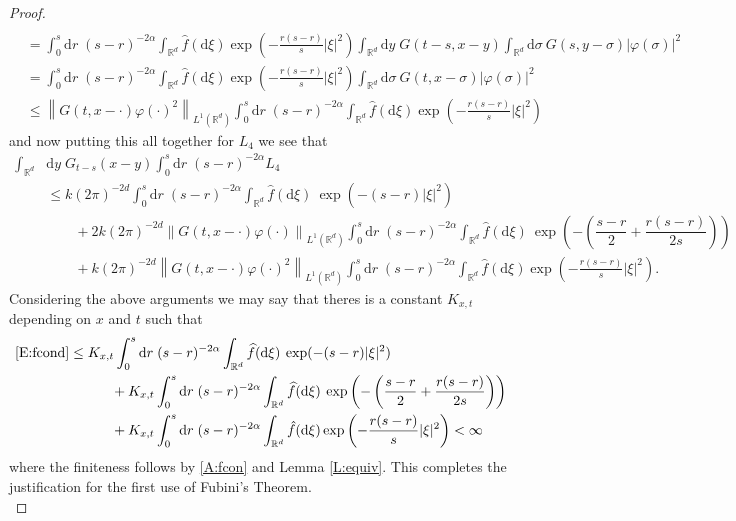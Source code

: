 \documentclass[a4paper,11pt]{article}%
\numberwithin{equation}{section}
\theoremstyle{plain}
\theoremstyle{definition}
\newcommand{\R}{\mathbb{R}}
\newcommand{\Norm}[1]{\left\|  #1   \right\|}
\newcommand{\ud}{\ensuremath{ \mathrm{d} }}
\begin{document}
\begin{proof}
\begin{align*}
	\\&= \int_0^s\ud r\; (s-r)^{-2\alpha}\int_{\R^d} \hat{f}(\ud \xi)\exp\left(-\frac{r(s-r)}{s}|\xi|^2\right)\int_{\R^d}\ud y \;G(t-s,x-y) \int_{\R^{d}}\ud \sigma\:G(s,y-\sigma)|\varphi(\sigma)|^2
	\\&= \int_0^s\ud r\; (s-r)^{-2\alpha}\int_{\R^d} \hat{f}(\ud \xi)\exp\left(-\frac{r(s-r)}{s}|\xi|^2\right)\int_{\R^{d}}\ud \sigma\:G(t,x-\sigma)|\varphi(\sigma)|^2
	\\&\le \Norm{G(t,x-\cdot)\varphi(\cdot)^2}_{L^1(\R^d)} \int_0^s\ud r\; (s-r)^{-2\alpha}\int_{\R^d} \hat{f}(\ud \xi)\exp\left(-\frac{r(s-r)}{s}|\xi|^2\right)
	\end{align*}
	and now putting this all together for $L_4$ we see that
	\begin{align*}
	\int_{\R^d}& \ud y \;G_{t-s}(x-y)\int_0^s\ud r\; (s-r)^{-2\alpha}L_4
	\\ &\le k (2\pi)^{-2d}\int_0^s\ud r\; (s-r)^{-2\alpha}\int_{\R^d}\widehat{f} (\ud \xi)\: \exp(-(s-r)|\xi|^2)
	\\&\hspace{2em}+ 2 k  (2\pi)^{-2d} \Norm{G(t,x-\cdot)\varphi(\cdot)}_{L^1(\R^d)}\int_0^s\ud r\; (s-r)^{-2\alpha}\int_{\R^d}\widehat{f}(\ud \xi) \: \exp\left(-\left(\dfrac{s-r}{2}+\dfrac{r(s-r)}{2s}\right)\right)
	\\&\hspace{2em} + k (2\pi)^{-2d}  \Norm{G(t,x-\cdot)\varphi(\cdot)^2}_{L^1(\R^d)} \int_0^s\ud r\; (s-r)^{-2\alpha}\int_{\R^d} \hat{f}(\ud \xi)\exp\left(-\frac{r(s-r)}{s}|\xi|^2\right).
	\end{align*}
	Considering the above arguments we may say that theres is a constant $K_{x,t}$ depending on $x$ and $t$ such that
	\begin{align*}
	\eqref{E:fcond} &\le K_{x,t}\int_0^s\ud r\; (s-r)^{-2\alpha}\int_{\R^d}\widehat{f} (\ud \xi)\: \exp(-(s-r)|\xi|^2)
	\\&\hspace{3em}+ K_{x,t}\int_0^s\ud r\; (s-r)^{-2\alpha}\int_{\R^d}\widehat{f}(\ud \xi) \: \exp\left(-\left(\dfrac{s-r}{2}+\dfrac{r(s-r)}{2s}\right)\right)
	\\&\hspace{3em} + K_{x,t}\int_0^s\ud r\; (s-r)^{-2\alpha}\int_{\R^d} \hat{f}(\ud \xi)\exp\left(-\frac{r(s-r)}{s}|\xi|^2\right) < \infty
	\end{align*}
	where the finiteness follows by \eqref{A:fcon} and Lemma \ref{L:equiv}. This completes the justification for the first use of Fubini's Theorem. \\
\end{proof}
\end{document}
